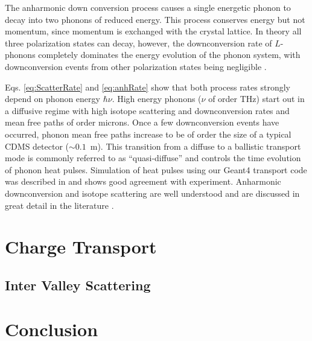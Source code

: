 \documentclass[final,3p,times,twocolumn]{elsarticle}
\begin{document}
The anharmonic down conversion process causes a single energetic phonon to decay into two phonons of reduced energy. This process conserves energy but not momentum, since momentum is exchanged with the crystal lattice. In theory all three polarization states can decay, however, the downconversion rate of $L$-phonons completely dominates the energy evolution of the phonon system, with downconversion events from other polarization states being negligible \cite{Tamura2}.


Eqs. \ref{eq:ScatterRate} and \ref{eq:anhRate} show that both process rates strongly depend on phonon energy $\hbar \nu$. High energy phonons ($\nu$ of order THz) start out in a diffusive regime with high isotope scattering and downconversion rates and mean free paths of order microns. Once a few downconversion events have occurred, phonon mean free paths increase to be of order the size of a typical CDMS detector ($\sim0.1$~m). This transition from a diffuse to a ballistic transport mode is commonly referred to as ``quasi-diffuse'' and controls the time evolution of phonon heat pulses. Simulation of heat pulses using our Geant4 transport code was described in \cite{Brandt} and shows good agreement with experiment. Anharmonic downconversion and isotope scattering are well understood and are discussed in great detail in the literature \cite{Tamura1}\cite{Tamura2}\cite{Wolfe}\cite{Tamura3}.




\section{Charge Transport}
\label{sec:ChargeTransport}



\subsection{Inter Valley Scattering}
\label{sec:InterValley}



\section{Conclusion}
\label{sec:Conclusion}

 
\end{document}
